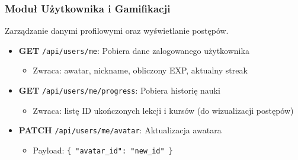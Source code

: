 \documentclass[11pt,a4paper]{article}
\numberwithin{equation}{section}
\begin{document}
\subsubsection{Moduł Użytkownika i Gamifikacji}
Zarządzanie danymi profilowymi oraz wyświetlanie postępów.
\begin{itemize}
    \item \textbf{GET} \texttt{/api/users/me}: Pobiera dane zalogowanego użytkownika
        \begin{itemize}
            \item Zwraca: awatar, nickname, obliczony EXP, aktualny streak
        \end{itemize}
    \item \textbf{GET} \texttt{/api/users/me/progress}: Pobiera historię nauki
        \begin{itemize}
            \item Zwraca: listę ID ukończonych lekcji i kursów (do wizualizacji postępów)
        \end{itemize}
    \item \textbf{PATCH} \texttt{/api/users/me/avatar}: Aktualizacja awatara
        \begin{itemize}
            \item Payload: \texttt{\{ "avatar\_id": "new\_id" \}}
        \end{itemize}
\end{itemize}
\end{document}
